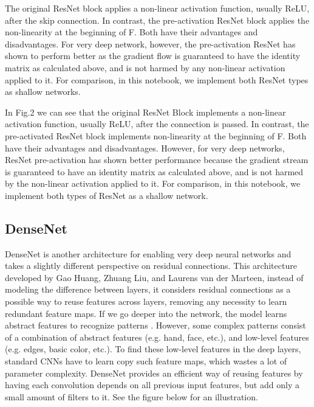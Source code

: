 \documentclass[peerreview]{IEEEtran}
\begin{document}
The original ResNet block applies a non-linear activation function, usually ReLU, after the skip connection. In contrast, the pre-activation ResNet block applies the non-linearity at the beginning of F. Both have their advantages and disadvantages. For very deep network, however, the pre-activation ResNet has shown to perform better as the gradient flow is guaranteed to have the identity matrix as calculated above, and is not harmed by any non-linear activation applied to it. For comparison, in this notebook, we implement both ResNet types as shallow networks.

In Fig.2 we can see that the original ResNet Block implements a non-linear activation function, usually ReLU, after the connection is passed. In contrast, the pre-activated ResNet block implements non-linearity at the beginning of F. Both have their advantages and disadvantages. However, for very deep networks, ResNet pre-activation has shown better performance because the gradient stream is guaranteed to have an identity matrix as calculated above, and is not harmed by the non-linear activation applied to it. For comparison, in this notebook, we implement both types of ResNet as a shallow network.

\subsection{DenseNet}
DenseNet is another architecture for enabling very deep neural networks and takes a slightly different perspective on residual connections. This architecture developed by Gao Huang, Zhuang Liu, and Laurens van der Marteen, instead of modeling the difference between layers, it considers residual connections as a possible way to reuse features across layers, removing any necessity to learn redundant feature maps. If we go deeper into the network, the model learns abstract features to recognize patterns \cite{huang2017densely}. However, some complex patterns consist of a combination of abstract features (e.g. hand, face, etc.), and low-level features (e.g. edges, basic color, etc.). To find these low-level features in the deep layers, standard CNNs have to learn copy such feature maps, which wastes a lot of parameter complexity. DenseNet provides an efficient way of reusing features by having each convolution depends on all previous input features, but add only a small amount of filters to it. See the figure below for an illustration.
\end{document}

